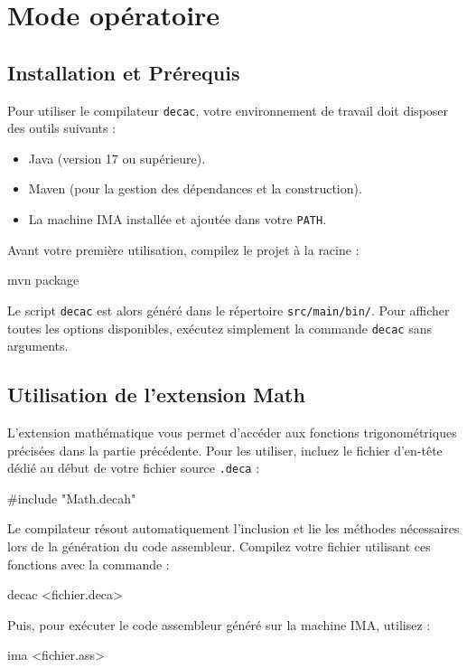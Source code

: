 \section{Mode opératoire}

\subsection{Installation et Prérequis}
\noindent
Pour utiliser le compilateur \texttt{decac}, votre environnement de travail doit disposer des outils suivants :
\begin{itemize}[label=$\to$]
    \item Java (version 17 ou supérieure).
    \item Maven (pour la gestion des dépendances et la construction).
    \item La machine IMA installée et ajoutée dans votre \texttt{PATH}. 
\end{itemize}

\noindent
Avant votre première utilisation, compilez le projet à la racine :
\begin{command}
mvn package
\end{command}
\noindent
Le script \texttt{decac} est alors généré dans le répertoire \texttt{src/main/bin/}. Pour afficher toutes les options disponibles, exécutez simplement la commande \texttt{decac} sans arguments.

\subsection{Utilisation de l'extension Math}
\noindent
L'extension mathématique vous permet d'accéder aux fonctions trigonométriques précisées dans la partie précédente. Pour les utiliser, incluez le fichier d'en-tête dédié au début de votre fichier source \texttt{.deca} :
\begin{command}
#include "Math.decah"
\end{command}
\noindent
Le compilateur résout automatiquement l'inclusion et lie les méthodes nécessaires lors de la génération du code assembleur. Compilez votre fichier utilisant ces fonctions avec la commande :
\begin{command}
decac <fichier.deca>
\end{command}
\noindent
Puis, pour exécuter le code assembleur généré sur la machine IMA, utilisez :
\begin{command}
ima <fichier.ass>
\end{command}